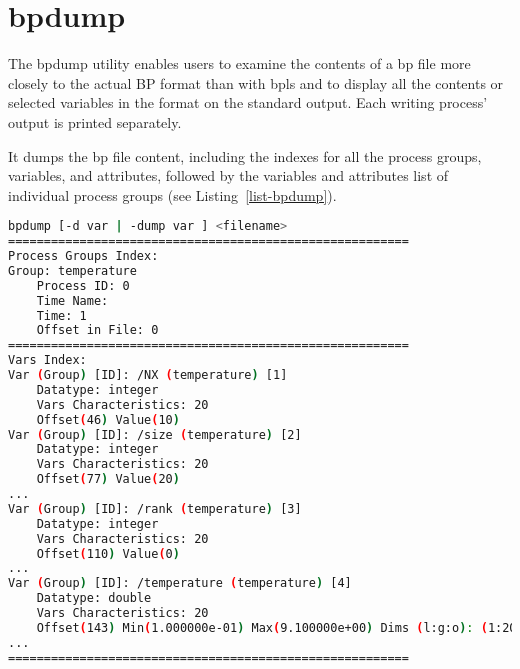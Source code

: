 \section{bpdump}

The bpdump utility enables users to examine the contents of a bp file more closely 
to the actual BP format than with bpls and to display all the contents or selected 
variables in the format on the standard output. Each writing process' output is 
printed separately. 

It dumps the bp file content, including the indexes for all the process groups, 
variables, and attributes, followed by the variables and attributes list of individual 
process groups (see Listing~\ref{list-bpdump}).

\begin{lstlisting}[language=bash,caption={bpdump utility},label={list-bpdump}]
bpdump [-d var | -dump var ] <filename>
======================================================== 
Process Groups Index:
Group: temperature
    Process ID: 0 
    Time Name:
    Time: 1 
    Offset in File: 0
========================================================
Vars Index:
Var (Group) [ID]: /NX (temperature) [1]
    Datatype: integer
    Vars Characteristics: 20
    Offset(46) Value(10)
Var (Group) [ID]: /size (temperature) [2] 
    Datatype: integer
    Vars Characteristics: 20 
    Offset(77) Value(20)
...
Var (Group) [ID]: /rank (temperature) [3] 
    Datatype: integer
    Vars Characteristics: 20 
    Offset(110) Value(0)
...
Var (Group) [ID]: /temperature (temperature) [4] 
    Datatype: double
    Vars Characteristics: 20
    Offset(143) Min(1.000000e-01) Max(9.100000e+00) Dims (l:g:o): (1:20:0,10:10:0)
...
========================================================
\end{lstlisting}


